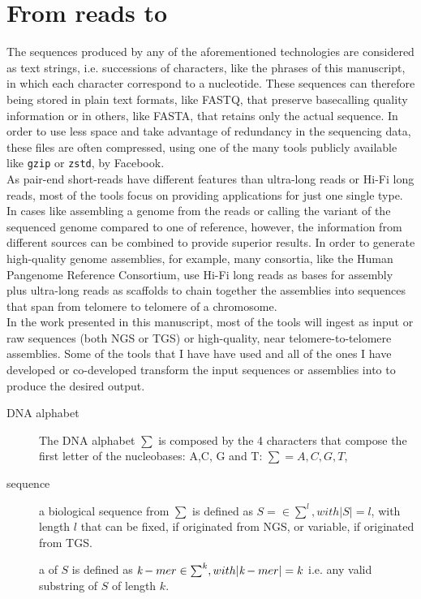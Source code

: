\section{From reads to \kmers}
The sequences produced by any of the aforementioned technologies are considered as text strings, i.e. successions of characters, like the phrases of this manuscript, in which each character correspond to a nucleotide. These sequences can therefore being stored in plain text formats, like FASTQ, that preserve basecalling quality information or in others, like FASTA, that retains only the actual sequence. In order to use less space and take advantage of redundancy in the sequencing data, these files are often compressed, using one of the many tools publicly available like \texttt{gzip} or \texttt{zstd}, by Facebook. \\
As pair-end short-reads have different features than ultra-long reads or Hi-Fi long reads, most of the tools focus on providing applications for just one single type. In cases like assembling a genome from the reads or calling the variant of the sequenced genome compared to one of reference, however, the information from different sources can be combined to provide superior results. In order to generate high-quality genome assemblies, for example, many consortia, like the Human Pangenome Reference Consortium, use Hi-Fi long reads as bases for assembly plus ultra-long reads as scaffolds to chain together the assemblies into sequences that span from telomere to telomere of a chromosome.\\
In the work presented in this manuscript, most of the tools will ingest as input or raw sequences (both NGS or TGS) or high-quality, near telomere-to-telomere assemblies. Some of the tools that I have have used and all of the ones I have developed or co-developed transform the input sequences or assemblies into \kmers to produce the desired output. \\
\begin{description}
	\item[DNA alphabet] The DNA alphabet $\sum$ is composed by the 4 characters that compose the first letter of the nucleobases: A,C, G and T: $ \sum = {A, C, G, T}$, 
	\item[sequence] a biological sequence from $\sum$ is defined as $ S =\in \sum^{l}, with \lvert S \rvert = l $, with length $l$ that can be fixed, if originated from NGS, or variable, if originated from TGS.
	\item[\kmer] a \kmer of $S$ is defined as $ \emph{k}-mer \in \sum^{k}, with \lvert \emph{k}-mer \rvert = k  $ i.e. any valid substring of $S$ of length $k$. 
\end{description}
